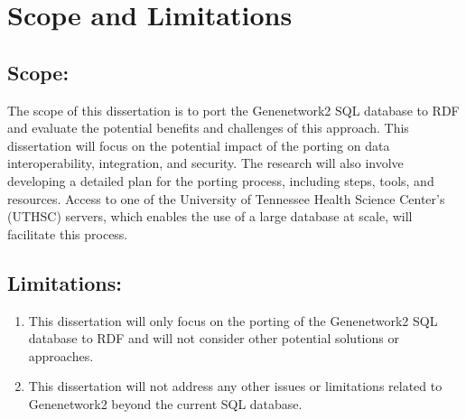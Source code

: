 \section{Scope and Limitations}
\subsection*{Scope:}

The scope of this dissertation is to port the Genenetwork2 SQL database to RDF and evaluate the potential benefits and challenges of this approach.  This dissertation will focus on the potential impact of the porting on data interoperability, integration, and security.  The research will also involve developing a detailed plan for the porting process, including steps, tools, and resources.  Access to one of the University of Tennessee Health Science Center's (UTHSC) servers, which enables the use of a large database at scale, will facilitate this process.

\subsection*{Limitations:}

\begin{enumerate}
\item This dissertation will only focus on the porting of the Genenetwork2 SQL database to RDF and will not consider other potential solutions or approaches.
\item This dissertation will not address any other issues or limitations related to Genenetwork2 beyond the current SQL database.
\end{enumerate}
